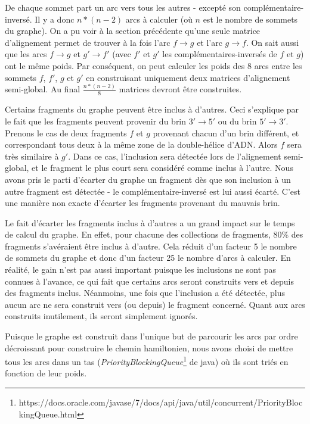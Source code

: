 \documentclass{article}
\begin{document}
De chaque sommet part un arc vers tous les autres - excepté son complémentaire-inversé. Il y a donc $n*(n-2)$ arcs à calculer (où $n$ est le nombre de sommets du graphe). On a pu voir à la section précédente qu'une seule matrice d'alignement permet de trouver à la fois l'arc $f\to g$ et l'arc $g \to f$. On sait aussi que les arcs $f \to g$ et $g' \to f'$  (avec $f'$ et $g'$ les complémentaires-inversés de $f$ et $g$) ont le même poids. Par conséquent, on peut calculer les poids des 8 arcs entre les sommets $f$, $f'$, $g$ et $g'$ en construisant uniquement deux matrices d'alignement semi-global. Au final $\frac{n*(n-2)}{8}$ matrices devront être construites.

Certains fragments du graphe peuvent être inclus à d'autres. Ceci s'explique par le fait que les fragments peuvent provenir du brin $3' \to 5'$ ou du brin $5' \to 3'$. Prenons le cas de deux fragments $f$ et $g$ provenant chacun d'un brin différent, et correspondant tous deux à la même zone de la double-hélice d'ADN. Alors $f$ sera très similaire à $g'$. Dans ce cas, l'inclusion sera détectée lors de l'alignement semi-global, et le fragment le plus court sera considéré comme inclus à l'autre. 
Nous avons pris le parti d'écarter du graphe un fragment dès que son inclusion à un autre fragment est détectée - le complémentaire-inversé est lui aussi écarté. C'est une manière non exacte d'écarter les fragments provenant du mauvais brin.

Le fait d'écarter les fragments inclus à d'autres a un grand impact sur le temps de calcul du graphe. En effet, pour chacune des collections de fragments, 80\% des fragments s'avéraient être inclus à d'autre. Cela réduit d'un facteur 5 le nombre de sommets du graphe et donc d'un facteur 25 le nombre d'arcs à calculer. En réalité, le gain n'est pas aussi important puisque les inclusions ne sont pas connues à l'avance, ce qui fait que certains arcs seront construits vers et depuis des fragments inclus. Néanmoins, une fois que l'inclusion a été détectée, plus aucun arc ne sera construit vers (ou depuis) le fragment concerné. Quant aux arcs construits inutilement, ils seront simplement ignorés.

Puisque le graphe est construit dans l'unique but de parcourir les arcs par ordre décroissant pour construire le chemin hamiltonien, nous avons choisi de mettre tous les arcs dans un tas (\textit{PriorityBlockingQueue}\footnote{https://docs.oracle.com/javase/7/docs/api/java/util/concurrent/PriorityBlockingQueue.html} de java) où ils sont triés en fonction de leur poids. 
\end{document}
